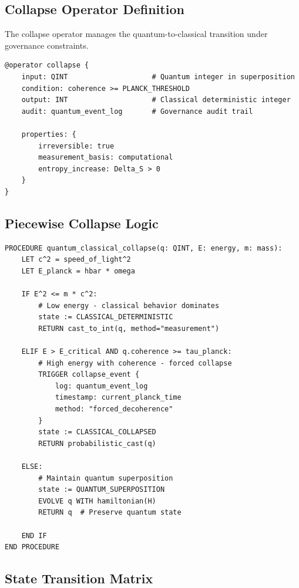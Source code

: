 \documentclass[12pt,a4paper]{article}
\begin{document}
\subsection{Collapse Operator Definition}

The collapse operator manages the quantum-to-classical transition under governance constraints.

\begin{lstlisting}[style=riftlang,caption={Collapse Operator Specification}]
@operator collapse {
    input: QINT                    # Quantum integer in superposition
    condition: coherence >= PLANCK_THRESHOLD
    output: INT                    # Classical deterministic integer
    audit: quantum_event_log       # Governance audit trail
    
    properties: {
        irreversible: true
        measurement_basis: computational
        entropy_increase: Delta_S > 0
    }
}
\end{lstlisting}

\subsection{Piecewise Collapse Logic}

\begin{lstlisting}[style=riftlang,caption={Collapse Decision Tree}]
PROCEDURE quantum_classical_collapse(q: QINT, E: energy, m: mass):
    LET c^2 = speed_of_light^2
    LET E_planck = hbar * omega
    
    IF E^2 <= m * c^2:
        # Low energy - classical behavior dominates
        state := CLASSICAL_DETERMINISTIC
        RETURN cast_to_int(q, method="measurement")
        
    ELIF E > E_critical AND q.coherence >= tau_planck:
        # High energy with coherence - forced collapse
        TRIGGER collapse_event {
            log: quantum_event_log
            timestamp: current_planck_time
            method: "forced_decoherence"
        }
        state := CLASSICAL_COLLAPSED
        RETURN probabilistic_cast(q)
        
    ELSE:
        # Maintain quantum superposition
        state := QUANTUM_SUPERPOSITION
        EVOLVE q WITH hamiltonian(H)
        RETURN q  # Preserve quantum state
        
    END IF
END PROCEDURE
\end{lstlisting}

\subsection{State Transition Matrix}
\end{document}
